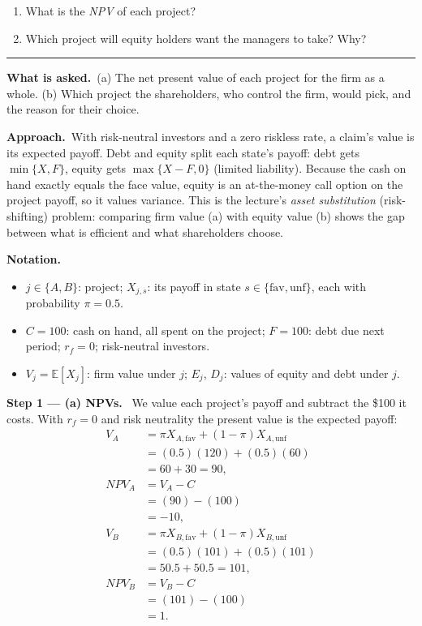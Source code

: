 \documentclass[11pt,a4paper]{article}
\newcommand{\notation}{\par\noindent\textbf{Notation.}}
\newcommand{\step}[2]{\par\medskip\noindent\textbf{Step #1 --- #2.}~}
\newcommand{\asked}{\par\medskip\noindent\textbf{What is asked.}~}
\newcommand{\approach}{\par\smallskip\noindent\textbf{Approach.}~}
\newcommand{\stmtend}{\par\endgroup\nopagebreak\noindent\rule{\linewidth}{0.4pt}\par\medskip}
\begin{document}
\begin{enumerate}
\def\labelenumi{\alph{enumi}.}
\item
  What is the \emph{NPV} of each project?
\item
  Which project will equity holders want the managers to take? Why?
\end{enumerate}
\stmtend

\asked (a) The net present value of each project for the firm as a whole. (b) Which project the
shareholders, who control the firm, would pick, and the reason for their choice.

\approach With risk-neutral investors and a zero riskless rate, a claim's value is its expected
payoff. Debt and equity split each state's payoff: debt gets $\min\{X,F\}$, equity gets
$\max\{X-F,0\}$ (limited liability). Because the cash on hand exactly equals the face value, equity
is an at-the-money call option on the project payoff, so it values variance. This is the lecture's
\emph{asset substitution} (risk-shifting) problem: comparing firm value (a) with equity value (b)
shows the gap between what is efficient and what shareholders choose.

\notation
\begin{itemize}
  \item $j\in\{A,B\}$: project; $X_{j,s}$: its payoff in state $s\in\{\text{fav},\text{unf}\}$, each with probability $\pi=0.5$.
  \item $C=100$: cash on hand, all spent on the project; $F=100$: debt due next period; $r_f=0$; risk-neutral investors.
  \item $V_j=\mathbb{E}[X_j]$: firm value under $j$; $E_j$, $D_j$: values of equity and debt under $j$.
\end{itemize}

\step{1}{(a) NPVs} We value each project's payoff and subtract the \$100 it costs. With $r_f=0$
and risk neutrality the present value is the expected payoff:
\begin{align}
  V_A &= \pi X_{A,\text{fav}}+(1-\pi)X_{A,\text{unf}} \label{t4e2-VA}\\
      &= (0.5)(120)+(0.5)(60) \nonumber\\
      &= 60+30 = 90, \nonumber\\
  \mathit{NPV}_A &= V_A-C \label{t4e2-NA}\\
      &= (90)-(100) \nonumber\\
      &= -10, \nonumber\\
  V_B &= \pi X_{B,\text{fav}}+(1-\pi)X_{B,\text{unf}} \label{t4e2-VB}\\
      &= (0.5)(101)+(0.5)(101) \nonumber\\
      &= 50.5+50.5 = 101, \nonumber\\
  \mathit{NPV}_B &= V_B-C \nonumber\\
      &= (101)-(100) \nonumber\\
      &= 1. \nonumber
\end{align}
\end{document}
